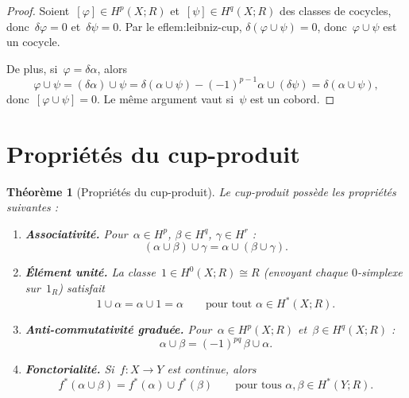 \documentclass[12pt,a4paper,openany]{book}
\theoremstyle{definition}
\theoremstyle{plain}
\newtheorem{theoreme}[definition]{Théorème}
\theoremstyle{remark}
\begin{document}
\begin{proof}
Soient~$[\varphi] \in H^p(X; R)$ et~$[\psi] \in H^q(X; R)$ des classes de cocycles,
donc~$\delta\varphi = 0$ et~$\delta\psi = 0$. Par le 
ef{lem:leibniz-cup},
$\delta(\varphi \cup \psi) = 0$, donc~$\varphi \cup \psi$ est un cocycle.

De plus, si~$\varphi = \delta\alpha$, alors
\[
  \varphi \cup \psi = (\delta\alpha) \cup \psi = \delta(\alpha \cup \psi)
  - (-1)^{p-1} \alpha \cup (\delta\psi) = \delta(\alpha \cup \psi),
\]
donc~$[\varphi \cup \psi] = 0$. Le même argument vaut si~$\psi$ est un cobord.
\end{proof}

\section{Propriétés du cup-produit}\label{sec:cup-proprietes}

\begin{theoreme}[Propriétés du cup-produit]\label{thm:cup-proprietes}
Le cup-produit possède les propriétés suivantes :
\begin{enumerate}[label=(\roman*)]
  \item \textbf{Associativité.}
    Pour~$\alpha \in H^p$, $\beta \in H^q$, $\gamma \in H^r$ :
    \[
      (\alpha \cup \beta) \cup \gamma = \alpha \cup (\beta \cup \gamma).
    \]
  \item \textbf{Élément unité.}
    La classe~$1 \in H^0(X; R) \cong R$ (envoyant chaque $0$-simplexe sur~$1_R$)
    satisfait
    \[
      1 \cup \alpha = \alpha \cup 1 = \alpha
      \qquad \text{pour tout } \alpha \in H^*(X; R).
    \]
  \item \textbf{Anti-commutativité graduée.}
    Pour~$\alpha \in H^p(X; R)$ et~$\beta \in H^q(X; R)$ :
    \[
      \alpha \cup \beta = (-1)^{pq}\, \beta \cup \alpha.
    \]
  \item \textbf{Fonctorialité.}
    Si~$f \colon X \to Y$ est continue, alors
    \[
      f^*(\alpha \cup \beta) = f^*(\alpha) \cup f^*(\beta)
      \qquad \text{pour tous } \alpha, \beta \in H^*(Y; R).
    \]
\end{enumerate}
\end{theoreme}
\end{document}
